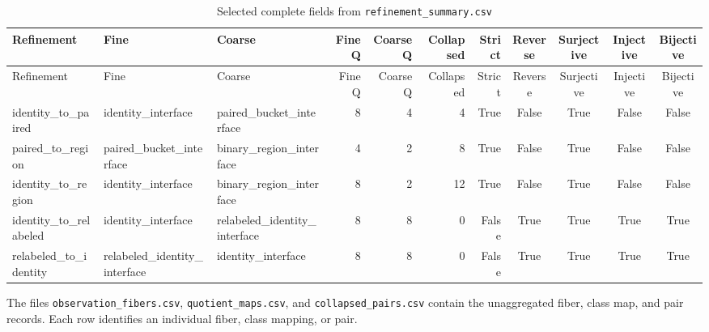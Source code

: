 \begin{landscape}
\scriptsize
\begin{longtable}{@{}lllrrrrcccc@{}}
\caption{Selected complete fields from \texttt{refinement\_summary.csv}}\label{tab:fullrefinement}\\
\toprule
Refinement & Fine & Coarse & Fine Q & Coarse Q & Collapsed & Strict & Reverse & Surjective & Injective & Bijective \\
\midrule
\endfirsthead
\toprule
Refinement & Fine & Coarse & Fine Q & Coarse Q & Collapsed & Strict & Reverse & Surjective & Injective & Bijective \\
\midrule
\endhead
identity\_to\_paired & identity\_interface & paired\_bucket\_interface & 8 & 4 & 4 & True & False & True & False & False \\
paired\_to\_region & paired\_bucket\_interface & binary\_region\_interface & 4 & 2 & 8 & True & False & True & False & False \\
identity\_to\_region & identity\_interface & binary\_region\_interface & 8 & 2 & 12 & True & False & True & False & False \\
identity\_to\_relabeled & identity\_interface & relabeled\_identity\_interface & 8 & 8 & 0 & False & True & True & True & True \\
relabeled\_to\_identity & relabeled\_identity\_interface & identity\_interface & 8 & 8 & 0 & False & True & True & True & True \\
\bottomrule
\end{longtable}
\end{landscape}

The files \texttt{observation\_fibers.csv}, \texttt{quotient\_maps.csv}, and \texttt{collapsed\_pairs.csv} contain the unaggregated fiber, class map, and pair records. Each row identifies an individual fiber, class mapping, or pair.
